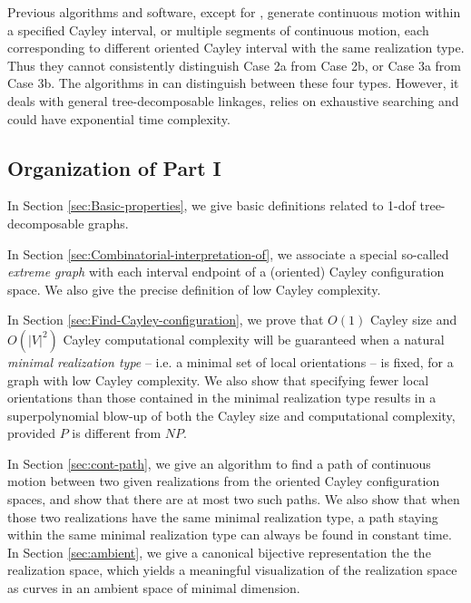 \documentclass[secthm,amsthm,english]{article}
\theoremstyle{definition}
\theoremstyle{remark}
\begin{document}
	Previous algorithms and software, except for \cite{bib:hidalgo2011reachability},
	generate continuous motion within a specified Cayley interval, 
	or multiple segments of continuous motion, 
	each corresponding to different oriented Cayley interval with the same realization type. 
Thus they cannot consistently distinguish Case 2a from Case 2b, or Case 3a from Case 3b. The algorithms in \cite{bib:hidalgo2011reachability} can distinguish between these four types. 
	However, it deals with general tree-decomposable linkages, relies on exhaustive searching
	 and could have exponential time complexity.









\subsection{Organization of Part I}

In Section \ref{sec:Basic-properties}, we give basic definitions 
related to 1-dof tree-decomposable graphs. 

In Section \ref{sec:Combinatorial-interpretation-of}, we associate a special so-called \emph{extreme graph} with each interval endpoint of a (oriented) Cayley configuration space. We also give the precise definition of low Cayley complexity.  

In Section \ref{sec:Find-Cayley-configuration}, we prove that 
$O(1)$ Cayley size and $O(|V|^2)$ Cayley computational complexity will be guaranteed
when a natural \emph{minimal realization type} -- i.e. a minimal set of local orientations -- is fixed, 
for a graph with low Cayley complexity. 
We also show that specifying fewer local orientations than those contained in the minimal realization type results in a
superpolynomial blow-up of  both the Cayley size and computational complexity, provided $P$ is different
from $NP$.

In Section \ref{sec:cont-path}, 
we give an algorithm to find a path of continuous motion between two given realizations from the oriented Cayley configuration spaces, 
and show that there are at most two such paths.  
We also show that when those two realizations have the same minimal realization type, 
a path staying within the same minimal realization type can always be found in constant time. 
In Section \ref{sec:ambient}, we give a canonical bijective representation the the realization space, which yields a meaningful visualization of the realization space as curves in an ambient space of minimal dimension.
\end{document}
